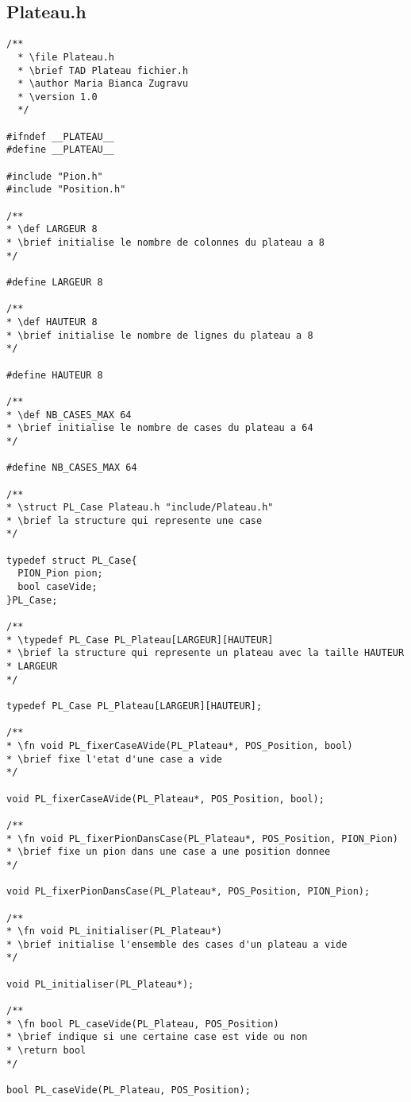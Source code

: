 \subsection{Plateau.h}
\begin{lstlisting}
/**
  * \file Plateau.h
  * \brief TAD Plateau fichier.h
  * \author Maria Bianca Zugravu
  * \version 1.0
  */

#ifndef __PLATEAU__
#define __PLATEAU__

#include "Pion.h"
#include "Position.h"

/**
* \def LARGEUR 8
* \brief initialise le nombre de colonnes du plateau a 8
*/

#define LARGEUR 8

/**
* \def HAUTEUR 8
* \brief initialise le nombre de lignes du plateau a 8
*/

#define HAUTEUR 8

/**
* \def NB_CASES_MAX 64
* \brief initialise le nombre de cases du plateau a 64
*/

#define NB_CASES_MAX 64

/**
* \struct PL_Case Plateau.h "include/Plateau.h"
* \brief la structure qui represente une case
*/

typedef struct PL_Case{
  PION_Pion pion;
  bool caseVide;
}PL_Case;

/**
* \typedef PL_Case PL_Plateau[LARGEUR][HAUTEUR]
* \brief la structure qui represente un plateau avec la taille HAUTEUR * LARGEUR
*/

typedef PL_Case PL_Plateau[LARGEUR][HAUTEUR];

/**
* \fn void PL_fixerCaseAVide(PL_Plateau*, POS_Position, bool)
* \brief fixe l'etat d'une case a vide
*/

void PL_fixerCaseAVide(PL_Plateau*, POS_Position, bool);

/**
* \fn void PL_fixerPionDansCase(PL_Plateau*, POS_Position, PION_Pion)
* \brief fixe un pion dans une case a une position donnee
*/

void PL_fixerPionDansCase(PL_Plateau*, POS_Position, PION_Pion);

/**
* \fn void PL_initialiser(PL_Plateau*)
* \brief initialise l'ensemble des cases d'un plateau a vide
*/

void PL_initialiser(PL_Plateau*);

/**
* \fn bool PL_caseVide(PL_Plateau, POS_Position)
* \brief indique si une certaine case est vide ou non
* \return bool
*/

bool PL_caseVide(PL_Plateau, POS_Position);


\end{lstlisting}
